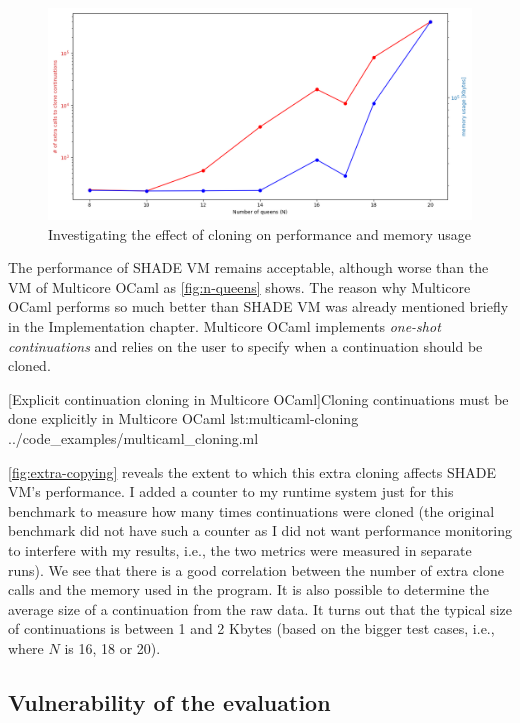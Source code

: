 \documentclass[class=article, crop=false]{standalone}
\begin{document}
\begin{figure}
    \centering
    \includegraphics[height=.3\textheight]{eval_plots/extra_cloning.png}
    \caption[Correlation between extra cloning and memory usage]{Investigating the effect of cloning on performance and memory usage}
    \label{fig:extra-copying}
\end{figure}

The performance of SHADE VM remains acceptable, although worse than the VM of
Multicore OCaml as \autoref{fig:n-queens} shows.
%
The reason why Multicore OCaml performs so much better than SHADE VM was
already mentioned briefly in the Implementation chapter. Multicore OCaml implements
\emph{one-shot continuations} and relies on the user to specify when a continuation
should be cloned.

{[Explicit continuation cloning in Multicore OCaml]Cloning continuations must be done explicitly in Multicore OCaml}
{lst:multicaml-cloning}
{../code_examples/multicaml_cloning.ml}

\autoref{fig:extra-copying} reveals the extent to which this extra cloning
affects SHADE VM's performance. I added a counter to my runtime system just for
this benchmark to measure how many times continuations were cloned (the original
benchmark did not have such a counter as I did not want performance monitoring
to interfere with my results, i.e., the two metrics were measured in separate
runs). We see that there is a good correlation between the number of extra
clone calls and the memory used in the program. It is also possible to determine
the average size of a continuation from the raw data. It turns out that the typical
size of continuations is between 1 and 2 Kbytes (based on the bigger test cases, i.e.,
where $N$ is 16, 18 or 20).

\subsection{Vulnerability of the evaluation}
\end{document}
